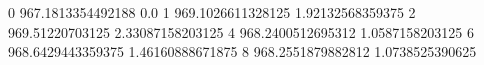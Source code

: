 0 967.1813354492188 0.0
1 969.1026611328125 1.92132568359375
2 969.51220703125 2.33087158203125
4 968.2400512695312 1.0587158203125
6 968.6429443359375 1.46160888671875
8 968.2551879882812 1.0738525390625
